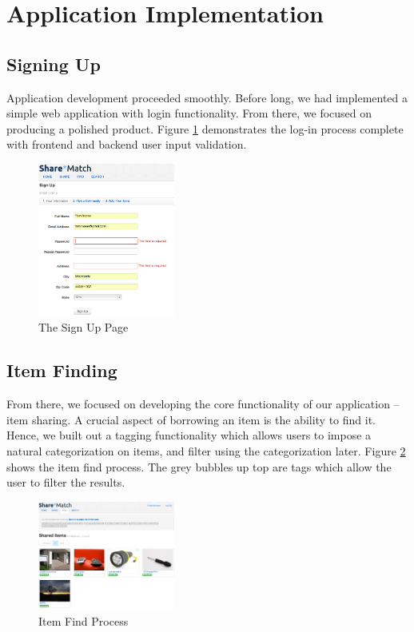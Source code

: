 \documentclass{acm_proc_article-sp}
\begin{document}
\section{Application Implementation}
\subsection{Signing Up}
Application development proceeded smoothly. Before long, we had implemented a simple web application with login functionality.
From there, we focused on producing a polished product. Figure \ref{fig:SignUpPage.png} demonstrates the log-in process
complete with frontend and backend user input validation.
\begin{figure}[h]
\begin{centering}
\includegraphics[width=0.4\textwidth]{SignUpPage.png} %
\caption{The Sign Up Page}
\label{fig:SignUpPage.png}
\end{centering}
\end{figure}

\subsection{Item Finding}
From there, we focused on developing the core functionality of our application -- item sharing. A crucial aspect of borrowing
an item is the ability to find it. Hence, we built out a tagging functionality which allows users to impose a natural
categorization on items, and filter using the categorization later. Figure \ref{fig:ItemSearch.png} shows the item find
process. The grey bubbles up top are tags which allow the user to filter the results.
\begin{figure}[h]
\begin{centering}
\includegraphics[width=0.4\textwidth]{ItemSearch.png}
\caption{Item Find Process}
\label{fig:ItemSearch.png}
\end{centering}
\end{figure}
\end{document}
